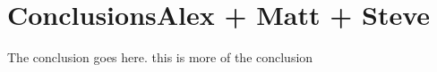 \documentclass[10pt, conference, compsocconf]{IEEEtran}
\begin{document}
%



\section{Conclusions{\color{red}Alex + Matt + Steve}}
\label{conc}
The conclusion goes here. this is more of the conclusion









\end{document}
